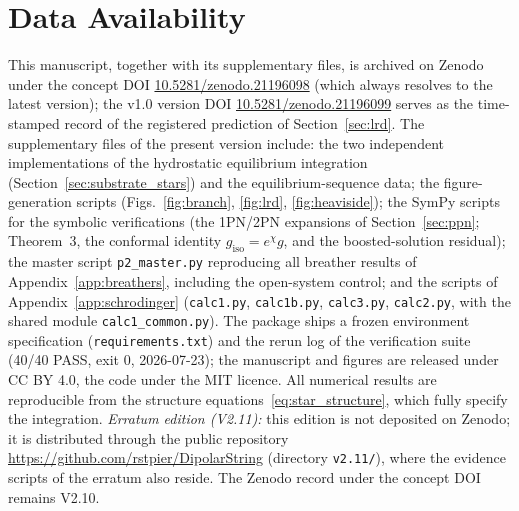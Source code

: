\documentclass[11pt,a4paper]{article}
\theoremstyle{plain}
\theoremstyle{remark}
\begin{document}
\section*{Data Availability}
This manuscript, together with its supplementary files, is archived on Zenodo under the concept DOI \href{https://doi.org/10.5281/zenodo.21196098}{10.5281/zenodo.21196098} (which always resolves to the latest version); the v1.0 version DOI \href{https://doi.org/10.5281/zenodo.21196099}{10.5281/zenodo.21196099} serves as the time-stamped record of the registered prediction of Section~\ref{sec:lrd}. The supplementary files of the present version include: the two independent implementations of the hydrostatic equilibrium integration (Section~\ref{sec:substrate_stars}) and the equilibrium-sequence data; the figure-generation scripts (Figs.~\ref{fig:branch}, \ref{fig:lrd}, \ref{fig:heaviside}); the SymPy scripts for the symbolic verifications (the 1PN/2PN expansions of Section~\ref{sec:ppn}; Theorem~3, the conformal identity $g_{\text{iso}} = e^{\chi}g$, and the boosted-solution residual); the master script \texttt{p2\_master.py} reproducing all breather results of Appendix~\ref{app:breathers}, including the open-system control; and the scripts of Appendix~\ref{app:schrodinger} (\texttt{calc1.py}, \texttt{calc1b.py}, \texttt{calc3.py}, \texttt{calc2.py}, with the shared module \texttt{calc1\_common.py}). The package ships a frozen environment specification (\texttt{requirements.txt}) and the rerun log of the verification suite (40/40 PASS, exit 0, 2026-07-23); the manuscript and figures are released under CC BY 4.0, the code under the MIT licence. All numerical results are reproducible from the structure equations~\eqref{eq:star_structure}, which fully specify the integration. \emph{Erratum edition (V2.11):} this edition is not deposited on Zenodo; it is distributed through the public repository \url{https://github.com/rstpier/DipolarString} (directory \texttt{v2.11/}), where the evidence scripts of the erratum also reside. The Zenodo record under the concept DOI remains V2.10.
\end{document}
